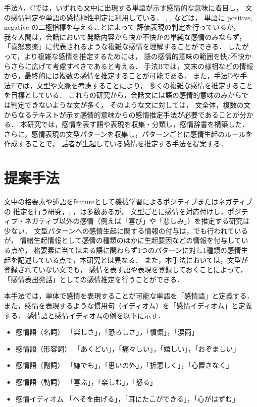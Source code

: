 \documentclass[japanese]{jnlp_1.3c}
\begin{document}
手法A，Cでは，いずれも文中に出現する単語が示す感情的な意味に着目し，
文の感情判定や単語の感情極性判定に利用している．
\cite{Kobayashi}, \cite{Fujimura}, \cite{Nasukawa}などは，
単語に positive, negative の二極指標を与えることによって
評価表現の判定を行っているが，
我々人間は，会話において発話内容から快か不快かの単純な感情のみならず，
「喜怒哀楽」に代表されるような複雑な感情を理解することができる．
したがって，より複雑な感情を推定するためには，
語の感情的意味の範囲を快/不快からさらに広げて考慮すべきであると考える．
手法Bでは，文末の様相などの情報から，最終的には複数の感情を推定することが可能である．
また，手法Dや手法Eでは，文型や文脈を考慮することにより，
多くの複雑な感情を推定することを目標としている．
これらの研究から，会話文には語の感情的意味のみからでは判定できないような文が多く，
そのような文に対しては，
文全体，複数の文からなるテキストが示す感情的意味からの感情推定手法が必要であることが分かる．
本研究では，感情を表す語や表現を収集・分類し，感情辞書を構築した．
さらに，感情表現の文型パターンを収集し，パターンごとに感情生起のルールを作成することで，
話者が生起している感情を推定する手法を提案する．


\section{提案手法}

文中の格要素や述語をfeatureとして機械学習によるポジティブまたはネガティブの
推定を行う研究\cite{Takamura}，\cite{Nasukawa}, \cite{Kobayashi}，\cite{Okanohara}は多数あるが，
文型ごとに感情を対応付けし，ポジティブ・ネガティブ以外の感情（例えば「喜び」や「悲しみ」）を推定する研究は少ない．
文型パターンへの感情生起に関する情報の付与は，\cite{TanakaTsutom}でも行われているが，
情緒生起情報として感情の種類のほかに生起要因などの情報を付与している点や，
格要素に当てはまる語に関わらず1つのパターンに対し1種類の感情生起を記述している点で，本研究とは異なる．
また，本手法においては，文型が登録されていない文でも，
感情を表す語や表現を登録しておくことによって，「感情表出発話」としての感情推定を行うことができる．

本手法では，単体で感情を表現することが可能な単語を「感情語」と定義する．
また，感情を表現するような慣用句（イディオム）を「感情イディオム」と定義する．
感情語と感情イディオムの例を以下に示す．

\begin{itemize}

\item 感情語（名詞）  「楽しさ」，「恐ろしさ」，「憤慨」，「涙雨」  
\item 感情語（形容詞） 「あくどい」，「痛々しい」，「嬉しい」，「おぞましい」 
\item 感情語（副詞） 「嫌でも」，「思いの外」，「折悪しく」，「心置きなく」 
\item 感情語（動詞） 「喜ぶ」，「楽しむ」，「怒る」 
\item 感情イディオム 「へそを曲げる」，「耳にたこができる」，「心がはずむ」

\end{itemize}
\end{document}
